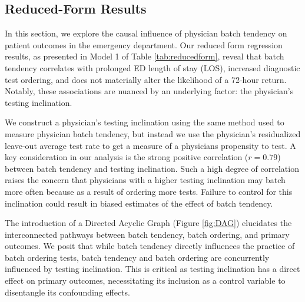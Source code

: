 \documentclass[,,nonblindrev]{informs}
\begin{document}
\hypertarget{reduced-form-results}{%
\subsection{Reduced-Form Results}\label{reduced-form-results}}

In this section, we explore the causal influence of physician batch
tendency on patient outcomes in the emergency department. Our reduced
form regression results, as presented in Model 1 of Table
\ref{tab:reducedform}, reveal that batch tendency correlates with
prolonged ED length of stay (LOS), increased diagnostic test ordering,
and does not materially alter the likelihood of a 72-hour return.
Notably, these associations are nuanced by an underlying factor: the
physician's testing inclination.

We construct a physician's testing inclination using the same method
used to measure physician batch tendency, but instead we use the
physician's residualized leave-out average test rate to get a measure of
a physicians propensity to test. A key consideration in our analysis is
the strong positive correlation (\(r = 0.79\)) between batch tendency
and testing inclination. Such a high degree of correlation raises the
concern that physicians with a higher testing inclination may batch more
often because as a result of ordering more tests. Failure to control for
this inclination could result in biased estimates of the effect of batch
tendency.

The introduction of a Directed Acyclic Graph (Figure \ref{fig:DAG})
elucidates the interconnected pathways between batch tendency, batch
ordering, and primary outcomes. We posit that while batch tendency
directly influences the practice of batch ordering tests, batch tendency
and batch ordering are concurrently influenced by testing inclination.
This is critical as testing inclination has a direct effect on primary
outcomes, necessitating its inclusion as a control variable to
disentangle its confounding effects.
\end{document}
